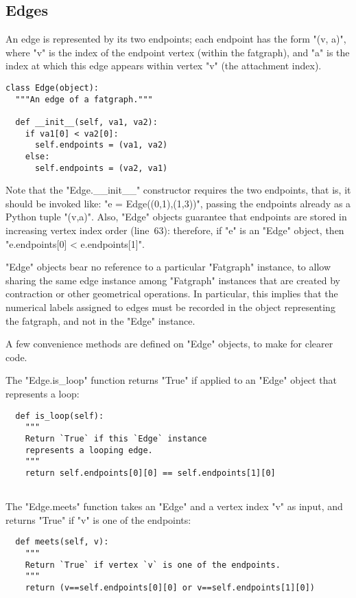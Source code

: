 \subsection{Edges}
\label{sec:edges}

An edge is represented by its two endpoints; each endpoint has the
form "(v, a)", where "v" is the index of the endpoint vertex
(within the fatgraph), and "a" is the index at which this edge
appears within vertex "v" (the attachment index).
\begin{lstlisting}
class Edge(object):
  """An edge of a fatgraph."""

  def __init__(self, va1, va2):
    if va1[0] < va2[0]:
      self.endpoints = (va1, va2)
    else:
      self.endpoints = (va2, va1)

\end{lstlisting}
Note that the "Edge.__init__" constructor requires the two
endpoints, that is, it should be invoked like: 
"e = Edge((0,1),(1,3))", passing the endpoints already as a Python tuple 
"(v,a)".  Also, "Edge" objects guarantee that endpoints are stored in
increasing vertex index order (line~63): therefore, if "e" is an "Edge"
object, then "e.endpoints[0] < e.endpoints[1]".

"Edge" objects bear no reference to a particular "Fatgraph" instance,
to allow sharing the same edge instance among "Fatgraph" instances that are
created by contraction or other geometrical operations.  In
particular, this implies that the numerical labels assigned to
edges must be recorded in the object representing the fatgraph, and
not in the "Edge" instance.

A few convenience methods are defined on "Edge" objects, to make for
clearer code.

The "Edge.is_loop" function returns "True" if applied to an
"Edge" object that represents a loop:
\begin{lstlisting}
  def is_loop(self):
    """
    Return `True` if this `Edge` instance 
    represents a looping edge.
    """
    return self.endpoints[0][0] == self.endpoints[1][0]
    
\end{lstlisting}

The "Edge.meets" function takes an "Edge" and a vertex index "v"
as input, and returns "True" if "v" is one of the endpoints:
\begin{lstlisting}
  def meets(self, v):
    """
    Return `True` if vertex `v` is one of the endpoints.
    """
    return (v==self.endpoints[0][0] or v==self.endpoints[1][0])

\end{lstlisting}

